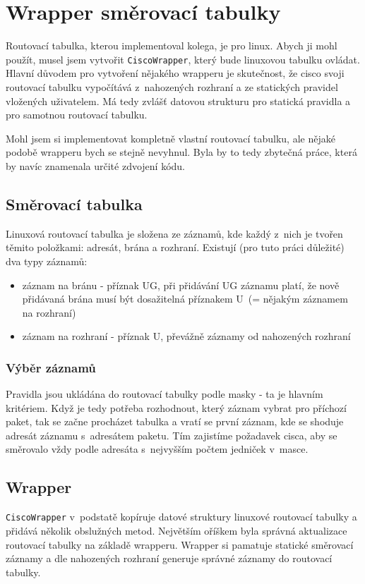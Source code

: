 \section{Wrapper směrovací tabulky}
Routovací tabulka, kterou implementoval kolega, je  pro linux. Abych ji mohl použít, musel jsem vytvořit \verb|CiscoWrapper|, který bude linuxovou tabulku ovládat. Hlavní důvodem pro vytvoření nějakého wrapperu je skutečnost, že cisco svoji routovací tabulku vypočítává z~nahozených rozhraní a ze statických pravidel vložených uživatelem. Má tedy zvlášť datovou strukturu pro statická pravidla a pro samotnou routovací tabulku.

Mohl jsem si implementovat kompletně vlastní routovací tabulku, ale nějaké podobě wrapperu bych se stejně nevyhnul. Byla by to tedy zbytečná práce, která by navíc znamenala určité zdvojení kódu.


\subsection{Směrovací tabulka}
Linuxová routovací tabulka je složena ze záznamů, kde každý z~nich je tvořen těmito položkami: adresát, brána a rozhraní. Existují (pro tuto práci důležité) dva typy záznamů:
\begin{itemize}
 \item záznam na bránu - příznak UG, při přidávání UG záznamu platí, že nově přidávaná brána musí být dosažitelná příznakem U~(= nějakým záznamem na rozhraní)
 \item záznam na rozhraní - příznak U, převážně záznamy od nahozených rozhraní
\end{itemize}


\subsubsection{Výběr záznamů}
Pravidla jsou ukládána do routovací tabulky podle masky - ta je hlavním kritériem. Když je tedy potřeba rozhodnout, který záznam vybrat pro příchozí paket, tak se začne procházet tabulka a vratí se první záznam, kde se shoduje adresát záznamu s~adresátem paketu. Tím zajistíme požadavek cisca, aby se směrovalo vždy podle adresáta s~nejvyšším počtem jedniček v~masce.

\subsection{Wrapper}
\verb|CiscoWrapper| v~podstatě kopíruje datové struktury linuxové routovací tabulky a přidává několik obslužných metod. Největším oříškem byla správná aktualizace routovací tabulky na základě wrapperu. Wrapper si pamatuje statické směrovací záznamy a dle nahozených rozhraní generuje správné záznamy do routovací tabulky. 

